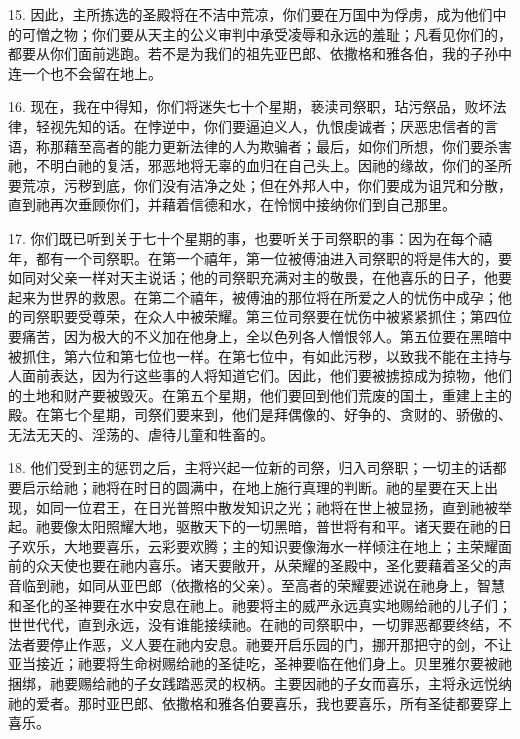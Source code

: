 15. 因此，主所拣选的圣殿将在不洁中荒凉，你们要在万国中为俘虏，成为他们中的可憎之物；你们要从天主的公义审判中承受凌辱和永远的羞耻；凡看见你们的，都要从你们面前逃跑。若不是为我们的祖先亚巴郎、依撒格和雅各伯，我的子孙中连一个也不会留在地上。\par

16. 现在，我在中得知，你们将迷失七十个星期，亵渎司祭职，玷污祭品，败坏法律，轻视先知的话。在悖逆中，你们要逼迫义人，仇恨虔诚者；厌恶忠信者的言语，称那藉至高者的能力更新法律的人为欺骗者；最后，如你们所想，你们要杀害祂，不明白祂的复活，邪恶地将无辜的血归在自己头上。因祂的缘故，你们的圣所要荒凉，污秽到底，你们没有洁净之处；但在外邦人中，你们要成为诅咒和分散，直到祂再次垂顾你们，并藉着信德和水，在怜悯中接纳你们到自己那里。\par

17. 你们既已听到关于七十个星期的事，也要听关于司祭职的事：因为在每个禧年，都有一个司祭职。在第一个禧年，第一位被傅油进入司祭职的将是伟大的，要如同对父亲一样对天主说话；他的司祭职充满对主的敬畏，在他喜乐的日子，他要起来为世界的救恩。在第二个禧年，被傅油的那位将在所爱之人的忧伤中成孕；他的司祭职要受尊荣，在众人中被荣耀。第三位司祭要在忧伤中被紧紧抓住；第四位要痛苦，因为极大的不义加在他身上，全以色列各人憎恨邻人。第五位要在黑暗中被抓住，第六位和第七位也一样。在第七位中，有如此污秽，以致我不能在主持与人面前表达，因为行这些事的人将知道它们。因此，他们要被掳掠成为掠物，他们的土地和财产要被毁灭。在第五个星期，他们要回到他们荒废的国土，重建上主的殿。在第七个星期，司祭们要来到，他们是拜偶像的、好争的、贪财的、骄傲的、无法无天的、淫荡的、虐待儿童和牲畜的。\par

18. 他们受到主的惩罚之后，主将兴起一位新的司祭，归入司祭职；一切主的话都要启示给祂；祂将在时日的圆满中，在地上施行真理的判断。祂的星要在天上出现，如同一位君王，在日光普照中散发知识之光；祂将在世上被显扬，直到祂被举起。祂要像太阳照耀大地，驱散天下的一切黑暗，普世将有和平。诸天要在祂的日子欢乐，大地要喜乐，云彩要欢腾；主的知识要像海水一样倾注在地上；主荣耀面前的众天使也要在祂内喜乐。诸天要敞开，从荣耀的圣殿中，圣化要藉着圣父的声音临到祂，如同从亚巴郎（依撒格的父亲）。至高者的荣耀要述说在祂身上，智慧和圣化的圣神要在水中安息在祂上。祂要将主的威严永远真实地赐给祂的儿子们；世世代代，直到永远，没有谁能接续祂。在祂的司祭职中，一切罪恶都要终结，不法者要停止作恶，义人要在祂内安息。祂要开启乐园的门，挪开那把守的剑，不让亚当接近；祂要将生命树赐给祂的圣徒吃，圣神要临在他们身上。贝里雅尔要被祂捆绑，祂要赐给祂的子女践踏恶灵的权柄。主要因祂的子女而喜乐，主将永远悦纳祂的爱者。那时亚巴郎、依撒格和雅各伯要喜乐，我也要喜乐，所有圣徒都要穿上喜乐。\par

